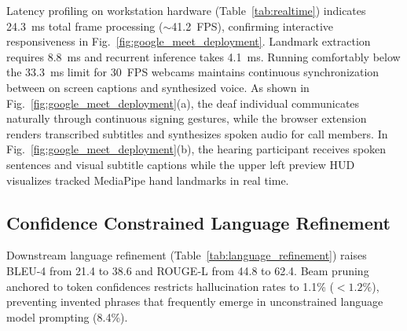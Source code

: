 \documentclass[conference]{IEEEtran}
\begin{document}
Latency profiling on workstation hardware (Table~\ref{tab:realtime}) indicates 24.3~ms total frame processing ($\sim$41.2~FPS), confirming interactive responsiveness in Fig.~\ref{fig:google_meet_deployment}. Landmark extraction requires 8.8~ms and recurrent inference takes 4.1~ms. Running comfortably below the 33.3~ms limit for 30~FPS webcams maintains continuous synchronization between on screen captions and synthesized voice. As shown in Fig.~\ref{fig:google_meet_deployment}(a), the deaf individual communicates naturally through continuous signing gestures, while the browser extension renders transcribed subtitles and synthesizes spoken audio for call members. In Fig.~\ref{fig:google_meet_deployment}(b), the hearing participant receives spoken sentences and visual subtitle captions while the upper left preview HUD visualizes tracked MediaPipe hand landmarks in real time.

\subsection{Confidence Constrained Language Refinement}
\vspace{-1.5mm}

\begin{table}[H]
\centering
\caption{Downstream Language Refinement and Hallucination Evaluation}
\label{tab:language_refinement}
\end{table}
\vspace{-1mm}

Downstream language refinement (Table~\ref{tab:language_refinement}) raises BLEU-4 from 21.4 to 38.6 and ROUGE-L from 44.8 to 62.4. Beam pruning anchored to token confidences restricts hallucination rates to 1.1\% ($<1.2\%$), preventing invented phrases that frequently emerge in unconstrained language model prompting (8.4\%).
\end{document}
